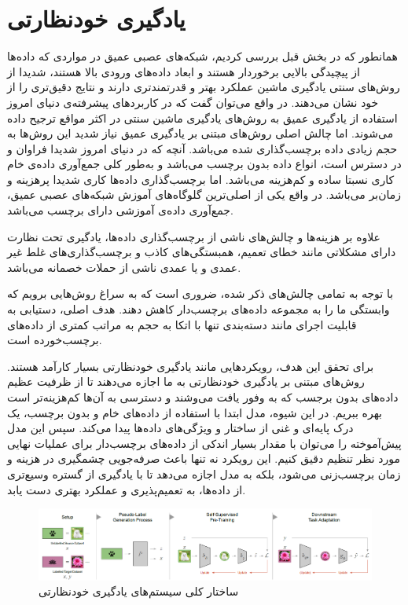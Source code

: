 \section{یادگیری خودنظارتی}

همانطور که در بخش قبل بررسی کردیم، شبکه‌های عصبی عمیق در مواردی که داده‌ها از پیچیدگی بالایی برخوردار هستند و ابعاد داده‌های ورودی بالا هستند، شدیدا از روش‌های سنتی یادگیری ماشین عملکرد بهتر و قدرتمندتری دارند و نتایج دقیق‌تری را از خود نشان می‌دهند. در واقع می‌توان گفت که در کاربردهای پیشرفته‌ی دنیای امروز استفاده از یادگیری عمیق به روش‌های یادگیری ماشین سنتی در اکثر مواقع ترجیح داده می‌شوند. اما چالش اصلی روش‌های مبتنی بر یادگیری عمیق نیاز شدید این روش‌ها به حجم زیادی داده برچسب‌گذاری شده می‌باشد. آنچه که در دنیای امروز شدیدا فراوان و در دسترس است، انواع داده بدون برچسب می‌باشد و به‌طور کلی جمع‌آوری داده‌ی خام کاری نسبتا ساده و کم‌هزینه می‌باشد. اما برچسب‌گذاری داده‌ها کاری شدیدا پرهزینه و زمان‌بر می‌باشد. در واقع یکی از اصلی‌ترین
گلوگاه‌های
آموزش شبکه‌های عصبی عمیق، جمع‌آوری داده‌ی آموزشی دارای برچسب می‌باشد.

علاوه بر هزینه‌ها و چالش‌های ناشی از برچسب‌گذاری داده‌ها، یادگیری تحت نظارت دارای مشکلاتی مانند 
خطای تعمیم،
همبستگی‌های کاذب
و برچسب‌گذاری‌های غلط غیر عمدی و یا عمدی ناشی از حملات خصمانه
می‌باشد\cite{liu2021self}.

با توجه به تمامی چالش‌های ذکر شده، ضروری است که به سراغ روش‌هایی برویم که وابستگی ما را به مجموعه داده‌های برچسب‌دار کاهش دهند. هدف اصلی، دستیابی به قابلیت اجرای مانند دسته‌بندی تنها با اتکا به حجم به مراتب کمتری از داده‌های برچسب‌خورده است.

برای تحقق این هدف، رویکردهایی مانند یادگیری خودنظارتی بسیار کارآمد هستند. روش‌های مبتنی بر یادگیری خودنظارتی به ما اجازه می‌دهند تا از ظرفیت عظیم داده‌های بدون برجسب که به وفور یافت می‌وشند و دسترسی به آن‌ها کم‌هزینه‌تر است بهره ببریم. در این شیوه، مدل ابتدا با استفاده از داده‌های خام و بدون برچسب، یک درک پایه‌ای و غنی از ساختار و ویژگی‌های داده‌ها پیدا می‌کند. سپس این مدل پیش‌آموخته را می‌توان با مقدار بسیار اندکی از داده‌های برچسب‌دار برای عملیات نهایی مورد نظر تنظیم دقیق کنیم. این رویکرد نه تنها باعث صرفه‌جویی چشمگیری در هزینه و زمان برچسب‌زنی می‌شود، بلکه به مدل اجازه می‌دهد تا با یادگیری از گستره وسیع‌تری از داده‌ها، به تعمیم‌پذیری و عملکرد بهتری دست یابد.

\begin{figure}[htbp]
  \centering
  \includegraphics[width=1.0\textwidth]{Images/Chapter2/selfsupervised-overview.png}
  \caption{ساختار کلی سیستم‌های یادگیری خودنظارتی}
  \label{fig:selfsupervised-overview}
\end{figure}

